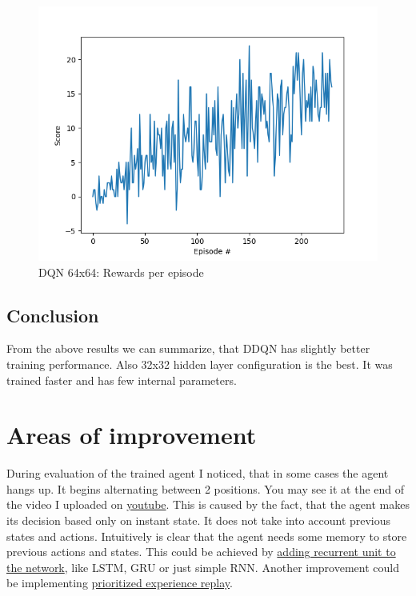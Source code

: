 \documentclass{report}
\begin{document}
\begin{figure}
\includegraphics[width=0.9\linewidth]{res/DQN_64x64/score.png}
\caption{DQN 64x64: Rewards per episode}
\label{fig:DQN_64x64}
\end{figure}

\subsection*{Conclusion}

From the above results we can summarize, that DDQN has slightly better training performance. Also 32x32 hidden layer configuration is the best. It was trained faster and has few internal parameters.


\section*{Areas of improvement}

During evaluation of the trained agent I noticed, that in some cases the agent hangs up. It begins alternating between 2 positions. You may see it at the end of the video I uploaded on \href{https://youtu.be/PPSJ2k9RBq0}{youtube}. This is caused by the fact, that the agent makes its decision based only on instant state. It does not take into account previous states and actions. Intuitively is clear that the agent needs some memory to store previous actions and states. This could be achieved by \href{http://cs229.stanford.edu/proj2016/report/ChenYingLaird-DeepQLearningWithRecurrentNeuralNetwords-report.pdf}{adding recurrent unit to the network}, like LSTM, GRU or just simple RNN.
Another improvement could be implementing \href{https://arxiv.org/abs/1511.05952}{prioritized experience replay}.
\end{document}
